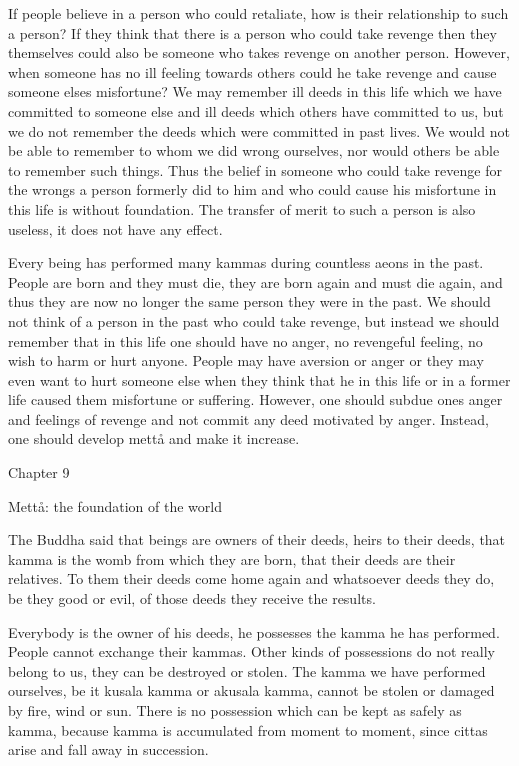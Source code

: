 \documentclass[12pt,twoside]{article}
\begin{document}
If people believe in a person who could retaliate, how is their
relationship to such a person? If they think that there is a person who
could take revenge then they themselves could also be someone who takes
revenge on another person. However, when someone has no ill feeling
towards others could he take revenge and cause someone
else{\textquotesingle}s misfortune? We may remember ill deeds in this
life which we have committed to someone else and ill deeds which others
have committed to us, but we do not remember the deeds which were
committed in past lives. We would not be able to remember to whom we
did wrong ourselves, nor would others be able to remember such things.
Thus the belief in someone who could take revenge for the wrongs a
person formerly did to him and who could cause his misfortune in this
life is without foundation. The transfer of merit to such a person is
also useless, it does not have any effect. 

Every being has performed many kammas during countless aeons in the
past. People are born and they must die, they are born again and must
die again, and thus they are now no longer the same person they were in
the past. We should not think of a person in the past who could take
revenge, but instead we should remember that in this life one should
have no anger, no revengeful feeling, no wish to harm or hurt anyone.
People may have aversion or anger or they may even want to hurt someone
else when they think that he in this life or in a former life caused
them misfortune or suffering. However, one should subdue
one{\textquotesingle}s anger and feelings of revenge and not commit any
deed motivated by anger. Instead, one should develop mett{\aa} and make
it increase. 

\clearpage
Chapter 9


\bigskip


\bigskip

Mett{\aa}: the foundation of the world


\bigskip


\bigskip

The Buddha said that beings are owners of their deeds, heirs to their
deeds, that kamma is the womb from which they are born, that their
deeds are their relatives. To them their deeds come home again and
whatsoever deeds they do, be they good or evil, of those deeds they
receive the results. 

Everybody is the owner of his deeds, he possesses the kamma he has
performed. People cannot exchange their kammas. Other kinds of
possessions do not really belong to us, they can be destroyed or
stolen. The kamma we have performed ourselves, be it kusala kamma or
akusala kamma, cannot be stolen or damaged by fire, wind or sun. There
is no possession which can be kept as safely as kamma, because kamma is
accumulated from moment to moment, since cittas arise and fall away in
succession. 
\end{document}
